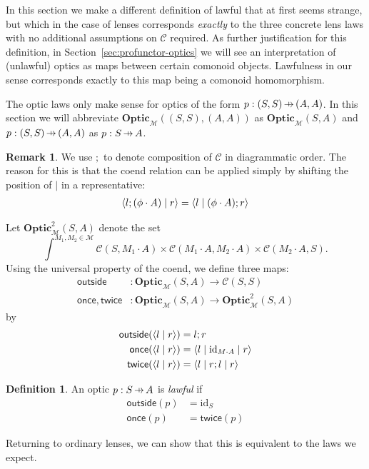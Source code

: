 \documentclass[11pt,letterpaper]{article}
\theoremstyle{plain}
\theoremstyle{definition}
\newtheorem{definition}[theorem]{Definition}
\newtheorem{remark}[theorem]{Remark}
\newcommand{\C}{\mathscr{C}}
\newcommand{\M}{\mathscr{M}}
\newcommand{\Optic}{\mathbf{Optic}}
\newcommand{\Twoptic}{\mathbf{Optic}^2}
\newcommand{\id}{\mathrm{id}}
\newcommand{\act}{\cdot}
\newcommand{\rep}[2]{{\ensuremath \left\langle #1 \mid #2 \right\rangle}}
\newcommand{\repthree}[3]{{\ensuremath \langle #1 \mid #2 \mid #3 \rangle}}
\newcommand{\outside}{\mathsf{outside}}
\newcommand{\once}{\mathsf{once}}
\newcommand{\twice}{\mathsf{twice}}
\newcommand{\hto}{\ensuremath{\,\mathaccent\shortmid\rightarrow\,}}
\newcommand{\todo}[1]{\textcolor{red}{\small #1}}
\begin{document}
In this section we make a different definition of lawful that at first seems strange, but which in the case of lenses corresponds \emph{exactly} to the three concrete lens laws with no additional assumptions on $\C$ required. As further justification for this definition, in Section~\ref{sec:profunctor-optics} we will see an interpretation of (unlawful) optics as maps between certain comonoid objects. Lawfulness in our sense corresponds exactly to this map being a comonoid homomorphism.

The optic laws only make sense for optics of the form $p : (S,S) \hto (A, A)$. In this section we will abbreviate $\Optic_\M((S, S), (A, A))$ as $\Optic_\M(S, A)$ and $p : (S, S) \hto (A, A)$ as $p : S \hto A$.

\begin{remark}
We use $;$ to denote composition of $\C$ in diagrammatic order. The reason for this is that the coend relation can be applied simply by shifting the position of $\mid$ in a representative:
\begin{align*}
\rep{l;(\phi \act A)}{r} = \rep{l}{(\phi \act A);r}
\end{align*}
\end{remark}

Let $\Twoptic_\M(S, A)$ denote the set \[ \int^{M_1, M_2 \in \M} \C(S, M_1 \act A) \times \C(M_1 \act A, M_2 \act A) \times \C(M_2 \act A, S). \]
Using the universal property of the coend, we define three maps:
\begin{align*}
  \outside &: \Optic_\M(S, A) \to \C(S, S) \\
  \once, \twice &: \Optic_\M(S, A) \to \Twoptic_\M(S, A)
\end{align*}
by
\begin{align*}
  \outside(\rep{l}{r}) &= l;r \\
  \once(\rep{l}{r}) &= \repthree{l}{\id_{M\act A}}{r} \\
  \twice(\rep{l}{r}) &= \repthree{l}{r;l}{r}
\end{align*}

\begin{definition}
  An optic $p : S \hto A$ is \emph{lawful} if
  \begin{align*}
    \outside(p) &= \id_S \\
    \once(p) &= \twice(p)
  \end{align*}
\end{definition}

Returning to ordinary lenses, we can show that this is equivalent to the laws we expect.
\end{document}
